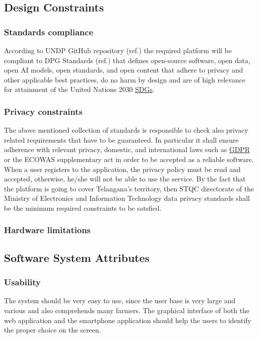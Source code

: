 \subsection{Design Constraints}

\subsubsection{Standards compliance}
According to UNDP GitHub repository (ref.\cite{UNDP_GitHub}) the required platform will be compliant to DPG Standards (ref.\cite{DPGS}) that defines open-source software, open data, open AI models, open standards, and open content that adhere to privacy and other applicable best practices, do no harm by design and are of high relevance for attainment of the United Nations 2030 \href{cell:sdg}{SDGs}.

\subsubsection{Privacy constraints}
The above mentioned collection of standards \cite{DPGS} is responsible to check also privacy related requirements that have to be guaranteed. In particular it shall ensure adherence with relevant privacy, domestic, and international laws such as \href{tab:acronyms_table}{GDPR} or the ECOWAS supplementary act  in order to be accepted as a reliable software. When a user registers to the application, the privacy policy must be read and accepted, otherwise, he/she will not be able to use the service. By the fact that the platform is going to cover Telangana's territory, then STQC directorate of the Ministry of Electronics and Information Technology \cite{DPGS} data privacy standards shall be the minimum required constraints to be satsfied.


\subsubsection{Hardware limitations}

\subsection{Software System Attributes}
\subsubsection{Usability}
The system should be very easy to use, since the user base is very large and various and also comprehends many farmers. The graphical interface of both the web application and the smartphone application should help the users to identify the proper choice on the screen.
